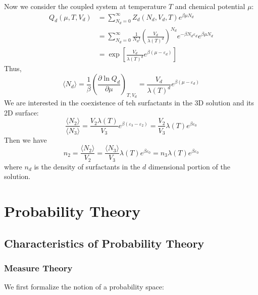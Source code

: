 \documentclass[12pt, a4paper, oneside, openright, titlepage]{book}
\begin{document}
Now we consider the coupled system at temperature $T$ and chemical potential $\mu$: \begin{align*}
    Q_d(\mu,T,V_d) &= \sum_{N_d=0}^{\infty}Z_d(N_d,V_d,T) e^{\beta \mu N_d} \\
    &= \sum_{N_d=0}^{\infty}\frac{1}{N_d!}\left(\frac{V_d}{\lambda(T)^d}\right)^{N_d}e^{-\beta N_d\varepsilon_d}e^{\beta\mu N_d} \\
    &= \exp\left[\frac{V_d}{\lambda(T)^d}e^{\beta(\mu-\varepsilon_d)}\right]
\end{align*}
Thus, $$\langle N_d\rangle = \frac{1}{\beta}\left(\frac{\partial \ln Q_d}{\partial \mu}\right)_{T,V_d} = \frac{V_d}{\lambda(T)^d}e^{\beta(\mu-\varepsilon_d)}$$
We are interested in the coexistence of teh surfactants in the 3D solution and its 2D surface: \begin{equation*}
    \frac{\langle N_2\rangle}{\langle N_3\rangle} = \frac{V_2\lambda(T)}{V_3}e^{\beta(\varepsilon_3-\varepsilon_2)} =\frac{V_2}{V_3}\lambda(T)e^{\beta\varepsilon_0}
\end{equation*}
Then we have $$n_2 = \frac{\langle N_2\rangle}{V_2} = \frac{\langle N_3\rangle}{V_3}\lambda(T)e^{\beta\varepsilon_0} = n_3\lambda(T)e^{\beta\varepsilon_0}$$ where $n_d$ is the density of surfactants in the $d$ dimensional portion of the solution.


\part{Probability Theory}


\chapter{Characteristics of Probability Theory}

\section{Measure Theory}

We first formalize the notion of a probability space:
\end{document}
